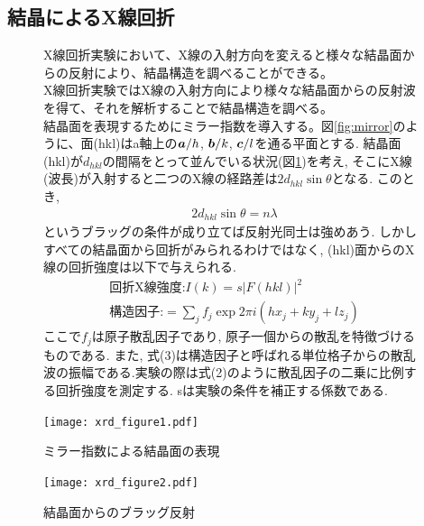 \documentclass[11pt]{ltjsarticle}
\begin{document}
    \subsection*{結晶によるX線回折}
    \begin{figure}[H]
      \centering
      \begin{minipage}[t]{0.6\textwidth}
        \vspace{0pt} %
        X線回折実験において、X線の入射方向を変えると様々な結晶面からの反射により、結晶構造を調べることができる。\\
        X線回折実験ではX線の入射方向により様々な結晶面からの反射波を得て、それを解析することで結晶構造を調べる。\\
        結晶面を表現するためにミラー指数を導入する。図\ref{fig:mirror}のように、面(hkl)はa軸上の$\vb*{a}/h$, $\vb*{b}/k$, $\vb*{c}/l$を通る平面とする. 
        結晶面(hkl)が$d_{hkl}$の間隔をとって並んでいる状況(図\ref{fig:hansha})を考え, そこにX線(波長\lambda)が入射すると二つのX線の経路差は$2d_{hkl}\sin{\theta}$となる.
        このとき, 
        \begin{gather}
          2d_{hkl}\sin{\theta}=n\lambda
          \label{eq:bragg}
        \end{gather}
        というブラッグの条件が成り立てば反射光同士は強めあう. しかしすべての結晶面から回折がみられるわけではなく, (hkl)面からのX線の回折強度は以下で与えられる.
        \begin{gather}
          \text{回折X線強度:}I(k)=s|F(hkl)|^2\\
          \text{構造因子:}=\sum_{j}^{} f_j \exp{2\pi i(hx_j +ky_j +lz_j)}
        \end{gather}
        ここで$f_j$は原子散乱因子であり, 原子一個からの散乱を特徴づけるものである. 
        また, 式(3)は構造因子と呼ばれる単位格子からの散乱波の振幅である.実験の際は式(2)のように散乱因子の二乗に比例する回折強度を測定する. sは実験の条件を補正する係数である. 
      \end{minipage}
      \hfill
      \begin{minipage}[t]{0.35\textwidth}
        \vspace{0pt}
        \centering
        \texttt{[image: xrd\_figure1.pdf]}
        \caption{ミラー指数による結晶面の表現}
        \label{fig:mirror}
        \texttt{[image: xrd\_figure2.pdf]}
        \caption{結晶面からのブラッグ反射}
        \label{fig:hansha}
      \end{minipage}
    \end{figure}
\end{document}
